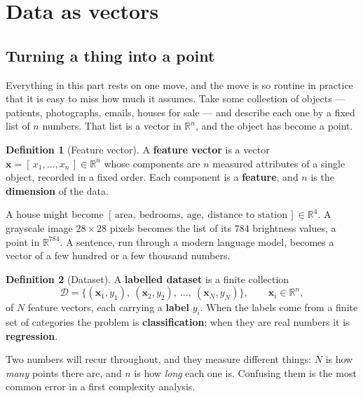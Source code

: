 \documentclass[11pt]{article}
\theoremstyle{plain}
\theoremstyle{definition}
\newtheorem{defn}{Definition}[section]
\theoremstyle{remark}
\newcommand{\R}{\mathbb{R}}
\newcommand{\vc}[1]{\mathbf{#1}}
\newcommand{\D}{\mathcal{D}}
\begin{document}
\section{Data as vectors}
\subsection{Turning a thing into a point}
Everything in this part rests on one move, and the move is so routine in
practice that it is easy to miss how much it assumes. Take some collection of
objects --- patients, photographs, emails, houses for sale --- and describe each
one by a fixed list of $n$ numbers. That list is a vector in $\R^{n}$, and the
object has become a point.

\begin{defn}[Feature vector]
A \textbf{feature vector} is a vector $\vc{x}=[\,x_1,\dots,x_n\,]\in\R^{n}$ whose
components are $n$ measured attributes of a single object, recorded in a fixed
order. Each component is a \textbf{feature}, and $n$ is the
\textbf{dimension} of the data.
\end{defn}

\noindent A house might become $[\,\text{area},\ \text{bedrooms},\
\text{age},\ \text{distance to station}\,]\in\R^{4}$. A grayscale image
$28\times28$ pixels becomes the list of its $784$ brightness values, a point in
$\R^{784}$. A sentence, run through a modern language model, becomes a vector of
a few hundred or a few thousand numbers.

\begin{defn}[Dataset]
A \textbf{labelled dataset} is a finite collection
\[
  \D = \bigl\{(\vc{x}_1,y_1),\ (\vc{x}_2,y_2),\ \dots,\ (\vc{x}_N,y_N)\bigr\},
  \qquad \vc{x}_i\in\R^{n},
\]
of $N$ feature vectors, each carrying a \textbf{label} $y_i$. When the labels
come from a finite set of categories the problem is \textbf{classification};
when they are real numbers it is \textbf{regression}.
\end{defn}

\noindent Two numbers will recur throughout, and they measure different things:
$N$ is how \emph{many} points there are, and $n$ is how \emph{long} each one is.
Confusing them is the most common error in a first complexity analysis.
\end{document}
